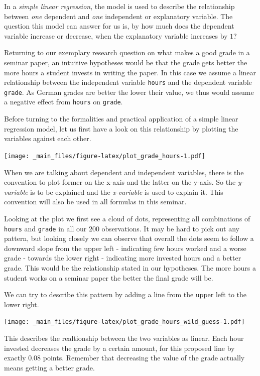 \documentclass[
]{book}
\begin{document}
In a \emph{simple linear regression}, the model is used to describe the relationship
between \emph{one} dependent and \emph{one} independent or explanatory variable. The
question this model can answer for us is, by how much does the dependent
variable increase or decrease, when the explanatory variable increases by \(1\)?

Returning to our exemplary research question on what makes a good grade in a
seminar paper, an intuitive hypotheses would be that the grade gets better the
more hours a student invests in writing the paper. In this case we assume a
linear relationship between the independent variable \texttt{hours} and the dependent
variable \texttt{grade}. As German grades are better the lower their value, we thus
would assume a negative effect from \texttt{hours} on \texttt{grade}.

Before turning to the formalities and practical application of a simple linear
regression model, let us first have a look on this relationship by plotting the
variables against each other.

\texttt{[image: \_main\_files/figure-latex/plot\_grade\_hours-1.pdf]}

When we are talking about dependent and independent variables, there is the
convention to plot former on the x-axis and the latter on the y-axis. So the
\emph{y-variable} is to be explained and the \emph{x-variable} is used to explain it.
This convention will also be used in all formulas in this seminar.

Looking at the plot we first see a cloud of dots, representing all combinations
of \texttt{hours} and \texttt{grade} in all our \(200\) observations. It may be hard to pick out
any pattern, but looking closely we can observe that overall the dots seem to
follow a downward slope from the upper left - indicating few hours worked and a
worse grade - towards the lower right - indicating more invested hours and a
better grade. This would be the relationship stated in our hypotheses. The more
hours a student works on a seminar paper the better the final grade will be.

We can try to describe this pattern by adding a line from the upper left to the
lower right.

\texttt{[image: \_main\_files/figure-latex/plot\_grade\_hours\_wild\_guess-1.pdf]}

This describes the realtionship between the two variables as linear. Each hour
invested decreases the grade by a certain amount, for this proposed line by
exactly \(0.08\) points. Remember that decreasing the value of the grade actually
means getting a better grade.
\end{document}
